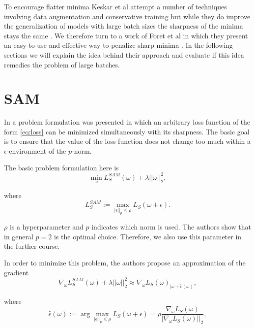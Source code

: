 \documentclass[10pt,conference,compsocconf]{IEEEtran}
\begin{document}
To encourage flatter minima Keskar et al attempt a number of techniques involving data augmentation and conservative training but while they do improve the generalization of models with large batch sizes the sharpness of the minima stays the same \cite{keskar2017largebatch}. We therefore turn to a work of Foret et al in which they present an easy-to-use and effective way to penalize sharp minima \cite{foret2021sharpnessaware}. In the following sections we will explain the idea behind their approach and evaluate if this idea remedies the problem of large batches.

\section{SAM}
In \cite{foret2021sharpnessaware} a problem formulation was presented in which an arbitrary loss function of the form \eqref{eq:loss} can be minimized simultaneously with its sharpness. The basic goal is to ensure that the value of the loss function does not change too much within a $\epsilon$-environment of the $p$-norm. 

The basic problem formulation here is 
\begin{equation} \label{eq:sam_real}
\min_\omega L_S^{SAM}(\omega) + \lambda ||\omega||_2^2,
\end{equation}

where 
\begin{equation} \label{eq:sam_eps}
L_S^{SAM} := \max_{|\epsilon||_p \leq \rho} L_S(\omega + \epsilon).
\end{equation}

$\rho$ is a hyperparameter and $p$ indicates which norm is used. The authors show that in general $p = 2$ is the optimal choice. Therefore, we also use this parameter in the further course. 

In order to minimize this problem, the authors propose an approximation of the gradient 
\begin{equation} \label{eq:sam_approx}
\nabla_\omega L_S^{SAM}(\omega) + \lambda ||\omega||_2^2 \approx \nabla_\omega L_S(\omega)_{|\omega + \hat{\epsilon}(\omega)}, 
\end{equation}

where 
\begin{equation} \label{eq:sam_eps_hat}
\hat{\epsilon}(\omega) := \arg \max_{|\epsilon||_p \leq \rho} L_S(\omega + \epsilon) = \rho \frac{\nabla_\omega L_S(\omega)}{|\nabla_\omega L_S(\omega)||_2},
\end{equation}
\end{document}
